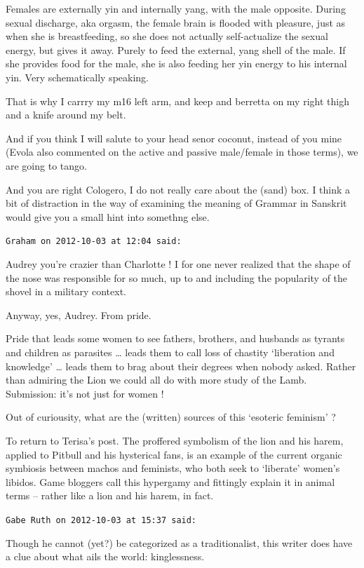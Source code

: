 \begin{footnotesize}
\begin{sffamily}
Females are externally yin and internally yang, with the male opposite. During sexual discharge, aka orgasm, the female brain is flooded with pleasure, just as when she is breastfeeding, so she does not actually self-actualize the sexual energy, but gives it away. Purely to feed the external, yang shell of the male. If she provides food for the male, she is also feeding her yin energy to his internal yin. Very schematically speaking.

That is why I carrry my m16 left arm, and keep and berretta on my right thigh and a knife around my belt.

And if you think I will salute to your head senor coconut, instead of you mine (Evola also commented on the active and passive male/female in those terms), we are going to tango.

And you are right Cologero, I do not really care about the (sand) box. I think a bit of distraction in the way of examining the meaning of Grammar in Sanskrit would give you a small hint into somethng else.


\hfill

\texttt{Graham on 2012-10-03 at 12:04 said: }

Audrey you're crazier than Charlotte ! I for one never realized that the shape of the nose was responsible for so much, up to and including the popularity of the shovel in a military context.

Anyway, yes, Audrey. From pride. 

Pride that leads some women to see fathers, brothers, and husbands as tyrants and children as parasites … leads them to call loss of chastity `liberation and knowledge’ … leads them to brag about their degrees when nobody asked. Rather than admiring the Lion we could all do with more study of the Lamb. Submission: it's not just for women !

Out of curiousity, what are the (written) sources of this `esoteric feminism’ ?

To return to Terisa's post. The proffered symbolism of the lion and his harem, applied to Pitbull and his hysterical fans, is an example of the current organic symbiosis between machos and feminists, who both seek to `liberate' women's libidos. Game bloggers call this hypergamy and fittingly explain it in animal terms – rather like a lion and his harem, in fact.


\hfill

\texttt{Gabe Ruth on 2012-10-03 at 15:37 said: }

Though he cannot (yet?) be categorized as a traditionalist, this writer does have a clue about what ails the world: kinglessness.



\end{sffamily}
\end{footnotesize}
